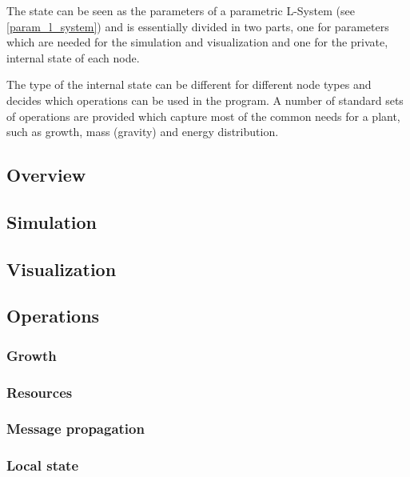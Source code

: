     The state can be seen as the parameters of a parametric
    L-System (see \ref{param_l_system}) and is essentially
    divided in two parts, one for parameters which are
    needed for the simulation and visualization and one for
    the private, internal state of each node.

    The type of the internal state can be different for
    different node types and decides which operations can be
    used in the program. A number of standard sets of
    operations are provided which capture most of the common
    needs for a plant, such as growth, mass (gravity) and
    energy distribution.





\subsection{Overview}



\subsection{Simulation}



\subsection{Visualization}


\subsection{Operations}
\subsubsection{Growth}



\subsubsection{Resources}

\subsubsection{Message propagation}


\subsubsection{Local state}


